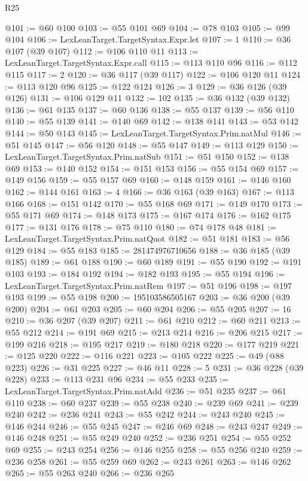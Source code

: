 \begin{lexlean}{R25}
\begin{coremodule}
@101 := @60 @100
@103 := @55 @101 @69
@104 := @78 @103
@105 := @99 @104
@106 := LexLeanTarget.TargetSyntax.Expr.let
@107 := 1
@110 := @36 @107 (@39 @107)
@112 := @106 @110 @11
@113 := LexLeanTarget.TargetSyntax.Expr.call
@115 := @113 @110 @96
@116 := @112 @115
@117 := 2
@120 := @36 @117 (@39 @117)
@122 := @106 @120 @11
@124 := @113 @120 @96
@125 := @122 @124
@126 := 3
@129 := @36 @126 (@39 @126)
@131 := @106 @129 @11
@132 := 102
@135 := @36 @132 (@39 @132)
@136 := @61 @135
@137 := @60 @136
@138 := @55 @137
@139 := @56 @110
@140 := @55 @139
@141 := @140 @69
@142 := @138 @141
@143 := @53 @142
@144 := @50 @143
@145 := LexLeanTarget.TargetSyntax.Prim.natMul
@146 := @51 @145
@147 := @56 @120
@148 := @55 @147
@149 := @113 @129
@150 := LexLeanTarget.TargetSyntax.Prim.natSub
@151 := @51 @150
@152 := @138 @69
@153 := @140 @152
@154 := @151 @153
@156 := @55 @154 @69
@157 := @149 @156
@159 := @55 @157 @69
@160 := @148 @159
@161 := @146 @160
@162 := @144 @161
@163 := 4
@166 := @36 @163 (@39 @163)
@167 := @113 @166
@168 := @151 @142
@170 := @55 @168 @69
@171 := @149 @170
@173 := @55 @171 @69
@174 := @148 @173
@175 := @167 @174
@176 := @162 @175
@177 := @131 @176
@178 := @75 @110
@180 := @74 @178 @48
@181 := LexLeanTarget.TargetSyntax.Prim.natQuot
@182 := @51 @181
@183 := @56 @129
@184 := @55 @183
@185 := 281474976710656
@188 := @36 @185 (@39 @185)
@189 := @61 @188
@190 := @60 @189
@191 := @55 @190
@192 := @191 @103
@193 := @184 @192
@194 := @182 @193
@195 := @55 @194
@196 := LexLeanTarget.TargetSyntax.Prim.natRem
@197 := @51 @196
@198 := @197 @193
@199 := @55 @198
@200 := 195103586505167
@203 := @36 @200 (@39 @200)
@204 := @61 @203
@205 := @60 @204
@206 := @55 @205
@207 := 16
@210 := @36 @207 (@39 @207)
@211 := @61 @210
@212 := @60 @211
@213 := @55 @212
@214 := @191 @69
@215 := @213 @214
@216 := @206 @215
@217 := @199 @216
@218 := @195 @217
@219 := @180 @218
@220 := @177 @219
@221 := @125 @220
@222 := @116 @221
@223 := @105 @222
@225 := @49 (@88 @223)
@226 := @31 @225
@227 := @46 @11
@228 := 5
@231 := @36 @228 (@39 @228)
@233 := @113 @231 @96
@234 := @55 @233
@235 := LexLeanTarget.TargetSyntax.Prim.natAdd
@236 := @51 @235
@237 := @61 @110
@238 := @60 @237
@239 := @55 @238
@240 := @239 @69
@241 := @239 @240
@242 := @236 @241
@243 := @55 @242
@244 := @243 @240
@245 := @146 @244
@246 := @55 @245
@247 := @246 @69
@248 := @243 @247
@249 := @146 @248
@251 := @55 @249 @240
@252 := @236 @251
@254 := @55 @252 @69
@255 := @243 @254
@256 := @146 @255
@258 := @55 @256 @240
@259 := @236 @258
@261 := @55 @259 @69
@262 := @243 @261
@263 := @146 @262
@265 := @55 @263 @240
@266 := @236 @265

\end{coremodule}
\end{lexlean}
